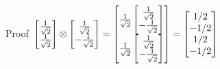 \documentclass[11pt, fleqn]{article}
\begin{document}
\begin{Large}
\\~\\ Proof
$\\~\\\begin{bmatrix}\frac{1}{\sqrt 2}\\\frac{1}{\sqrt 2}\end{bmatrix}\otimes
\begin{bmatrix}\frac{1}{\sqrt 2}\\-\frac{1}{\sqrt 2}\end{bmatrix}=
\begin{bmatrix}\frac{1}{\sqrt 2}\begin{bmatrix}\frac{1}{\sqrt 2}\\-\frac{1}{\sqrt 2} \end{bmatrix}
\\\frac{1}{\sqrt 2}\begin{bmatrix}\frac{1}{\sqrt 2}\\-\frac{1}{\sqrt 2} \end{bmatrix}\end{bmatrix}=
\begin{bmatrix}1/2\\-1/2\\1/2\\-1/2 \end{bmatrix}
$


\end{Large}
\end{document}
